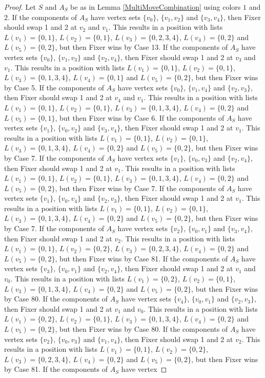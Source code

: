 \documentclass[12pt]{amsart}
\theoremstyle{plain}
\theoremstyle{definition}
\theoremstyle{remark}
\begin{document}
\begin{proof}
Let $S$ and $A_S$ be as in Lemma \ref{MultiMoveCombination} using colors $1$ and $2$. If the components of $A_S$ have vertex sets $\{v_0\}$, $\{v_1, v_2\}$ and $\{v_3, v_4\}$, then Fixer should swap 1 and 2 at $v_2$ and $v_1$. This results in a position with lists $L(v_1) = \{0, 1\}$, $L(v_2) = \{0, 1\}$, $L(v_3) = \{0, 2, 3, 4\}$, $L(v_4) = \{0, 2\}$ and $L(v_5) = \{0, 2\}$, but then Fixer wins by Case 13. If the components of $A_S$ have vertex sets $\{v_0\}$, $\{v_1, v_3\}$ and $\{v_2, v_4\}$, then Fixer should swap 1 and 2 at $v_3$ and $v_1$. This results in a position with lists $L(v_1) = \{0, 1\}$, $L(v_2) = \{0, 1\}$, $L(v_3) = \{0, 1, 3, 4\}$, $L(v_4) = \{0, 1\}$ and $L(v_5) = \{0, 2\}$, but then Fixer wins by Case 5. If the components of $A_S$ have vertex sets $\{v_0\}$, $\{v_1, v_4\}$ and $\{v_2, v_3\}$, then Fixer should swap 1 and 2 at $v_4$ and $v_1$. This results in a position with lists $L(v_1) = \{0, 1\}$, $L(v_2) = \{0, 1\}$, $L(v_3) = \{0, 1, 3, 4\}$, $L(v_4) = \{0, 2\}$ and $L(v_5) = \{0, 1\}$, but then Fixer wins by Case 6. If the components of $A_S$ have vertex sets $\{v_1\}$, $\{v_0, v_2\}$ and $\{v_3, v_4\}$, then Fixer should swap 1 and 2 at $v_1$. This results in a position with lists $L(v_1) = \{0, 1\}$, $L(v_2) = \{0, 1\}$, $L(v_3) = \{0, 1, 3, 4\}$, $L(v_4) = \{0, 2\}$ and $L(v_5) = \{0, 2\}$, but then Fixer wins by Case 7. If the components of $A_S$ have vertex sets $\{v_1\}$, $\{v_0, v_3\}$ and $\{v_2, v_4\}$, then Fixer should swap 1 and 2 at $v_1$. This results in a position with lists $L(v_1) = \{0, 1\}$, $L(v_2) = \{0, 1\}$, $L(v_3) = \{0, 1, 3, 4\}$, $L(v_4) = \{0, 2\}$ and $L(v_5) = \{0, 2\}$, but then Fixer wins by Case 7. If the components of $A_S$ have vertex sets $\{v_1\}$, $\{v_0, v_4\}$ and $\{v_2, v_3\}$, then Fixer should swap 1 and 2 at $v_1$. This results in a position with lists $L(v_1) = \{0, 1\}$, $L(v_2) = \{0, 1\}$, $L(v_3) = \{0, 1, 3, 4\}$, $L(v_4) = \{0, 2\}$ and $L(v_5) = \{0, 2\}$, but then Fixer wins by Case 7. If the components of $A_S$ have vertex sets $\{v_2\}$, $\{v_0, v_1\}$ and $\{v_3, v_4\}$, then Fixer should swap 1 and 2 at $v_2$. This results in a position with lists $L(v_1) = \{0, 1\}$, $L(v_2) = \{0, 2\}$, $L(v_3) = \{0, 2, 3, 4\}$, $L(v_4) = \{0, 2\}$ and $L(v_5) = \{0, 2\}$, but then Fixer wins by Case 81. If the components of $A_S$ have vertex sets $\{v_3\}$, $\{v_0, v_1\}$ and $\{v_2, v_4\}$, then Fixer should swap 1 and 2 at $v_1$ and $v_0$. This results in a position with lists $L(v_1) = \{0, 2\}$, $L(v_2) = \{0, 1\}$, $L(v_3) = \{0, 1, 3, 4\}$, $L(v_4) = \{0, 2\}$ and $L(v_5) = \{0, 2\}$, but then Fixer wins by Case 80. If the components of $A_S$ have vertex sets $\{v_4\}$, $\{v_0, v_1\}$ and $\{v_2, v_3\}$, then Fixer should swap 1 and 2 at $v_1$ and $v_0$. This results in a position with lists $L(v_1) = \{0, 2\}$, $L(v_2) = \{0, 1\}$, $L(v_3) = \{0, 1, 3, 4\}$, $L(v_4) = \{0, 2\}$ and $L(v_5) = \{0, 2\}$, but then Fixer wins by Case 80. If the components of $A_S$ have vertex sets $\{v_2\}$, $\{v_0, v_3\}$ and $\{v_1, v_4\}$, then Fixer should swap 1 and 2 at $v_2$. This results in a position with lists $L(v_1) = \{0, 1\}$, $L(v_2) = \{0, 2\}$, $L(v_3) = \{0, 2, 3, 4\}$, $L(v_4) = \{0, 2\}$ and $L(v_5) = \{0, 2\}$, but then Fixer wins by Case 81. If the components of $A_S$ have vertex 
\end{proof}
\end{document}
